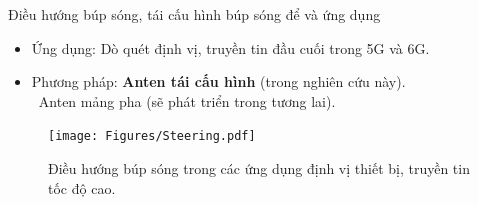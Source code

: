 \begin{frame}{Điều hướng búp sóng, tái cấu hình búp sóng để và ứng dụng}
    \begin{itemize}
        \item Ứng dụng: Dò quét định vị, truyền tin đầu cuối trong 5G và 6G.
        \item Phương pháp: \textbf{Anten tái cấu hình} (trong nghiên cứu này). \\ \quad \quad \quad \quad \ \quad \quad Anten mảng pha (sẽ phát triển trong tương lai).
    \end{itemize}
    \vspace{-4mm}
    \begin{figure}
        \centering
        \texttt{[image: Figures/Steering.pdf]}
        \vspace{-4mm}
        \caption{Điều hướng búp sóng trong các ứng dụng định vị thiết bị, truyền tin tốc độ cao.}
        \label{fig:Steering}
    \end{figure}
\end{frame}


